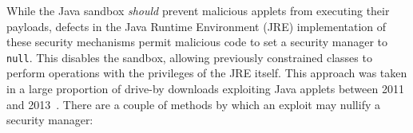 \documentclass{sig-alternate}
\begin{document}

%
While the Java sandbox \textit{should} prevent malicious applets from
executing their payloads, defects in the
Java Runtime Environment (JRE) implementation of these security mechanisms permit
malicious code to set a security manager to \texttt{null}.  
This disables the sandbox, allowing
previously constrained classes to perform operations with the privileges of 
the JRE itself. 
This approach was taken in a large proportion of drive-by downloads exploiting
Java applets between 2011 and 2013~\cite{fireeye_2013}. 
%
There are a couple of methods by which an exploit may nullify a security manager:
\end{document}

